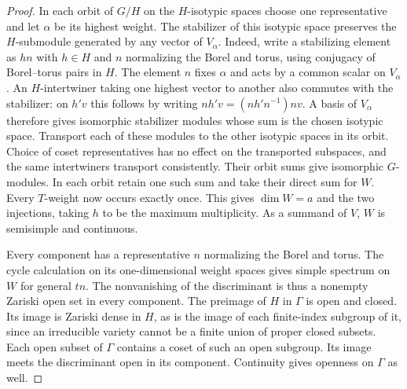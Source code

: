 \begin{proof}
In each orbit of \(G/H\) on the \(H\)-isotypic spaces choose one
representative and let \(\alpha\) be its highest weight.
The stabilizer of this isotypic space preserves the \(H\)-submodule
generated by any vector of \(V_\alpha\). Indeed, write a stabilizing
element as \(h n\) with \(h\in H\) and \(n\) normalizing the Borel
and torus, using conjugacy of Borel--torus pairs in \(H\).
The element \(n\) fixes \(\alpha\) and acts by a common scalar on
\(V_\alpha\). An \(H\)-intertwiner taking one highest vector to another
also commutes with the stabilizer: on \(h'v\) this follows by writing
\(n h'v=(n h'n^{-1})nv\). A basis of \(V_\alpha\) therefore gives
isomorphic stabilizer modules whose sum is the chosen isotypic space.
Transport each of these modules to the other isotypic spaces in its
orbit. Choice of coset representatives has no effect on the transported
subspaces, and the same intertwiners transport consistently.
Their orbit sums give isomorphic \(G\)-modules. In each orbit retain
one such sum and take their direct sum for \(W\). Every \(T\)-weight
now occurs exactly once. This gives \(\dim W=a\) and the two
injections, taking \(h\) to be the maximum multiplicity.
As a summand of \(V\), \(W\) is semisimple and continuous.

Every component has a representative \(n\) normalizing the Borel and
torus. The cycle calculation on its one-dimensional weight spaces
gives simple spectrum on \(W\) for general \(tn\). The nonvanishing
of the discriminant is thus a nonempty Zariski open set in every
component. The preimage of \(H\) in \(\Gamma\) is open and closed.
Its image is Zariski dense in \(H\), as is the image of each finite-index
subgroup of it, since an irreducible variety cannot be a finite union
of proper closed subsets. Each open subset of \(\Gamma\) contains a
coset of such an open subgroup. Its image meets the discriminant open
in its component. Continuity gives openness on \(\Gamma\) as well.
\end{proof}

